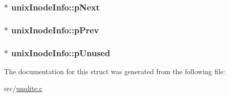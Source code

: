 \hypertarget{structunix_inode_info_a80181ba4ef71dd0d8e55e97baedc761e}{
\subsubsection[{p\-Next}]{$\ast$ unix\-Inode\-Info\-::p\-Next}}\label{d0/d86/structunix_inode_info_a80181ba4ef71dd0d8e55e97baedc761e}
\hypertarget{structunix_inode_info_a6575edce9898b48870c6f48047c01d01}{
\subsubsection[{p\-Prev}]{$\ast$ unix\-Inode\-Info\-::p\-Prev}}\label{d0/d86/structunix_inode_info_a6575edce9898b48870c6f48047c01d01}
\hypertarget{structunix_inode_info_a0dda9ad35734fa161d1f0b13b671c1c6}{
\subsubsection[{p\-Unused}]{$\ast$ unix\-Inode\-Info\-::p\-Unused}}\label{d0/d86/structunix_inode_info_a0dda9ad35734fa161d1f0b13b671c1c6}


The documentation for this struct was generated from the following file\-:\begin{DoxyCompactItemize}
\item 
src/\hyperlink{unqlite_8c}{unqlite.\-c}\end{DoxyCompactItemize}
